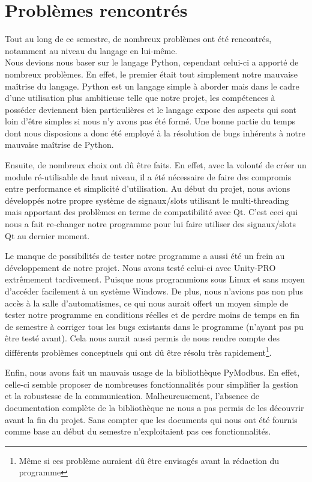 \section{Problèmes rencontrés}

Tout au long de ce semestre, de nombreux problèmes ont été rencontrés, notamment au niveau du langage en lui-même. \\
Nous devions nous baser sur le langage Python, cependant celui-ci a apporté de nombreux problèmes.
\newline
En effet, le premier était tout simplement notre mauvaise maîtrise du langage. Python est un langage simple à aborder mais dans le cadre d'une utilisation plus ambitieuse telle que notre projet, les compétences à posséder deviennent bien particulières et le langage expose des aspects qui sont loin d'être simples si nous n'y avons pas été formé. \newline
Une bonne partie du temps dont nous disposions a donc été employé à la résolution de bugs inhérents à notre mauvaise maîtrise de Python.

\smallSkip

Ensuite, de nombreux choix ont dû être faits. En effet, avec la volonté de créer un module ré-utilisable de haut niveau, il a été nécessaire de faire des compromis entre performance et simplicité d'utilisation.\newline
Au début du projet, nous avions développés notre propre système de signaux/slots utilisant le multi-threading mais apportant des problèmes en terme de compatibilité avec Qt. C'est ceci qui nous a fait re-changer notre programme pour lui faire utiliser des signaux/slots Qt au dernier moment.

\smallSkip

Le manque de possibilités de tester notre programme a aussi été un frein au développement de notre projet. Nous avons testé celui-ci avec Unity-PRO extrêmement tardivement.\newline
Puisque nous programmions sous Linux et sans moyen d'accéder facilement à un système Windows.\newline
De plus, nous n'avions pas non plus accès à la salle d'automatismes, ce qui nous aurait offert un moyen simple de tester notre programme en conditions réelles et de perdre moins de temps en fin de semestre à corriger tous les bugs existants dans le programme (n'ayant pas pu être testé avant). Cela nous aurait aussi permis de nous rendre compte des différents problèmes conceptuels qui ont dû être résolu très rapidement\footnote{Même si ces problème auraient dû être envisagés avant la rédaction du programme}.

\smallSkip

Enfin, nous avons fait un mauvais usage de la bibliothèque PyModbus. En effet, celle-ci semble proposer de nombreuses fonctionnalités pour simplifier la gestion et la robustesse de la communication. Malheureusement, l'absence de documentation complète de la bibliothèque ne nous a pas permis de les découvrir avant la fin du projet. Sans compter que les documents qui nous ont été fournis comme base au début du semestre n'exploitaient pas ces fonctionnalités.

